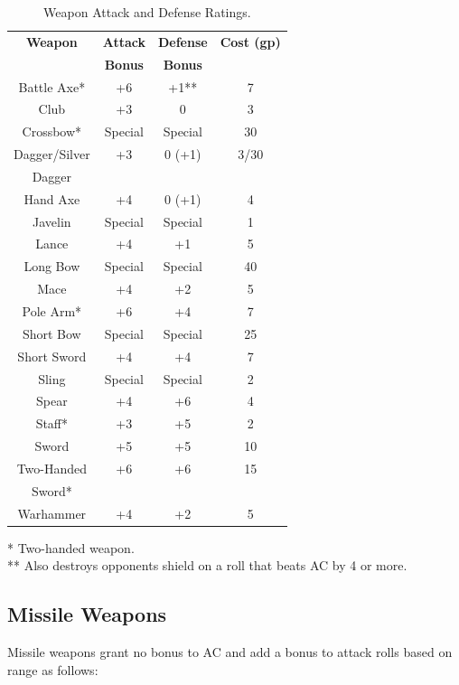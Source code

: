 \documentclass[letterpaper,sansserif,tightsqueeze]{rpg-module}
\begin{document}
\begin{table}[h!]
	\centering
	\begin{tabular}{|c|c|c|c|}
		\hline
		\textbf{Weapon}	& \textbf{Attack}	& \textbf{Defense}	& \textbf{Cost (gp)}	\\
		\textbf{} 		& \textbf{Bonus}	& \textbf{Bonus}		& \textbf{}				\\ \hline
		Battle Axe*				& +6		& +1**		& 7 	\\ \hline
		Club					& +3		& 0			& 3  	\\ \hline
		Crossbow*				& Special	& Special	& 30  	\\ \hline
		Dagger/Silver			& +3		& 0 (+1)	& 3/30  \\
		Dagger					& 			& 			&		\\ \hline
		Hand Axe				& +4		& 0 (+1)	& 4 	\\ \hline
		Javelin					& Special	& Special	& 1 	\\ \hline
		Lance					& +4		& +1		& 5 	\\ \hline
		Long Bow				& Special	& Special	& 40 	\\ \hline
		Mace					& +4		& +2		& 5 	\\ \hline
		Pole Arm*				& +6		& +4		& 7 	\\ \hline
		Short Bow				& Special	& Special	& 25 	\\ \hline
		Short Sword				& +4		& +4		& 7 	\\ \hline
		Sling					& Special	& Special	& 2 	\\ \hline
		Spear					& +4		& +6		& 4 	\\ \hline
		Staff*					& +3		& +5		& 2 	\\ \hline
		Sword					& +5		& +5		& 10 	\\ \hline
		Two-Handed				& +6		& +6		& 15 	\\
		Sword*					& 			& 			&  		\\ \hline
		Warhammer				& +4		& +2		& 5 	\\ \hline
	\end{tabular}
	\caption{Weapon Attack and Defense Ratings.}
	\label{table:WeaponAttackAndDefenseRatings}
\end{table}
\vspace{-0.5cm}
* Two-handed weapon.\\
** Also destroys opponents shield on a roll that beats AC by 4 or more.

\vspace{0.5cm}

\subsection*{Missile Weapons}
Missile weapons grant no bonus to AC and add a bonus to attack rolls based on range as follows:
\end{document}
